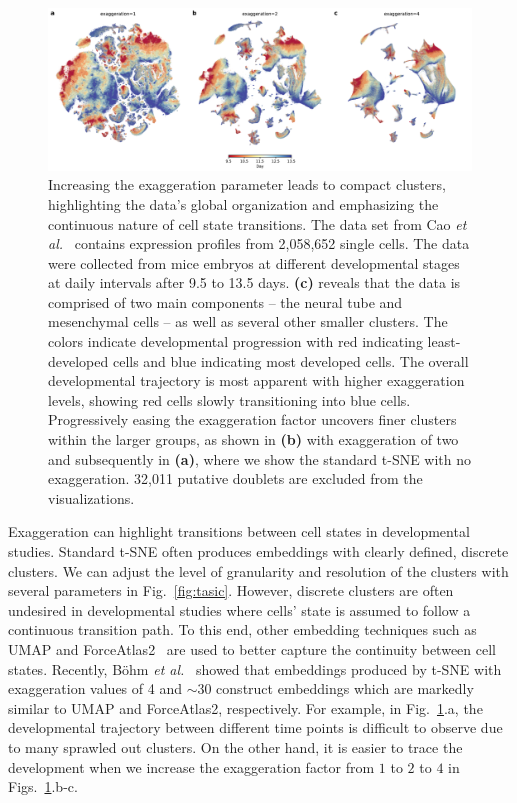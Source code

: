 \documentclass[twocolumn]{bmcart}
\begin{document}
\begin{figure}[htbp]
  \includegraphics[width=\textwidth]{cao2019}
  \caption{\label{fig:cao}
  Increasing the exaggeration parameter leads to compact clusters, highlighting
  the data's global organization and emphasizing the continuous nature of
  cell state transitions. The data set from Cao \textit{et al.}~\cite{cao2019single}
  contains expression profiles from 2,058,652 single cells. The data were
  collected from mice embryos at different developmental stages at daily
  intervals after 9.5 to 13.5 days. \textbf{(c)} reveals that the data is
  comprised of two main components -- the neural tube and mesenchymal
  cells -- as well as several other smaller clusters. The
  colors indicate developmental progression with red indicating
  least-developed cells and blue indicating most developed cells. The
  overall developmental trajectory is most apparent with higher
  exaggeration levels, showing red cells slowly transitioning into blue
  cells. Progressively easing the exaggeration factor uncovers finer
  clusters within the larger groups, as shown in \textbf{(b)} with
  exaggeration of two and subsequently in \textbf{(a)}, where we show the
  standard t-SNE with no exaggeration. 32,011 putative doublets are
  excluded from the visualizations.
}
\end{figure}

Exaggeration can highlight transitions between cell states in developmental
studies. Standard t-SNE often produces embeddings with clearly defined, discrete
clusters. We can adjust the level of granularity and resolution of the clusters
with several parameters in Fig.~\ref{fig:tasic}. However, discrete clusters are
often undesired in developmental studies where cells' state is assumed to follow
a continuous transition path. To this end, other embedding techniques such as UMAP and
ForceAtlas2~\cite{jacomy2014forceatlas2} are used to better capture the continuity
between cell states. Recently, B{\"o}hm \textit{et al.}~\cite{bohm2020unifying}
showed that embeddings produced by t-SNE with exaggeration values of 4 and
$\sim30$ construct embeddings which are markedly similar to UMAP and
ForceAtlas2, respectively. For example, in Fig.~\ref{fig:cao}.a, the
developmental trajectory between different time points is difficult to observe
due to many sprawled out clusters. On the other hand, it is easier to trace the
development when we increase the exaggeration factor from $1$ to $2$ to $4$ in
Figs.~\ref{fig:cao}.b-c.
\end{document}
